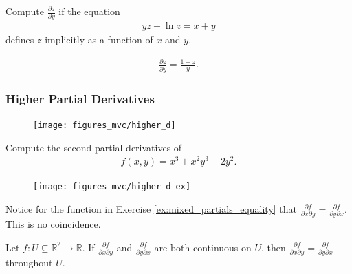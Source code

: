\documentclass[12pt,letterpaper,reqno]{article}
\numberwithin{equation}{section}
\newcommand{\R}{\ensuremath{\mathbb R}}
\begin{document}
{\begin{exercise}
	Compute $\frac{\partial z}{\partial y}$ if the equation
\begin{align*}
	yz-\ln z=x+y
\end{align*}	
defines $z$ implicitly as a function of $x$ and $y$.
\end{exercise}

{\color{red}
\begin{solution}
\begin{align*}
	\frac{\partial z}{\partial y}=\frac{1-z}{y}.
\end{align*}	
\end{solution}

}



\subsubsection{Higher Partial Derivatives}
\begin{figure}[h]
	\begin{center}
		\texttt{[image: figures\_mvc/higher\_d]}
	\end{center}
\end{figure}

\newpage 

\begin{exercise}\label{ex:mixed_partials_equality}
Compute the second partial derivatives of 
\begin{align*}
	f(x,y)=x^3+x^2y^3-2y^2.
\end{align*}	
\end{exercise}

\begin{figure}[h]
	\begin{center}
		\texttt{[image: figures\_mvc/higher\_d\_ex]}
	\end{center}
\end{figure}
Notice for the function in Exercise \ref{ex:mixed_partials_equality} that $\frac{\partial f}{\partial x \partial y}=\frac{\partial f}{\partial y \partial x}$. This is no coincidence.

\begin{thm}\label{thm:clairaut}
Let $f:U \subseteq \R^2 \to \R$. If $\frac{\partial f}{\partial x \partial y}$ and $\frac{\partial f}{\partial y \partial x}$	are both continuous on $U$, then $\frac{\partial f}{\partial x \partial y}=\frac{\partial f}{\partial y \partial x}$ throughout $U$.
\end{thm}

}
\end{document}
